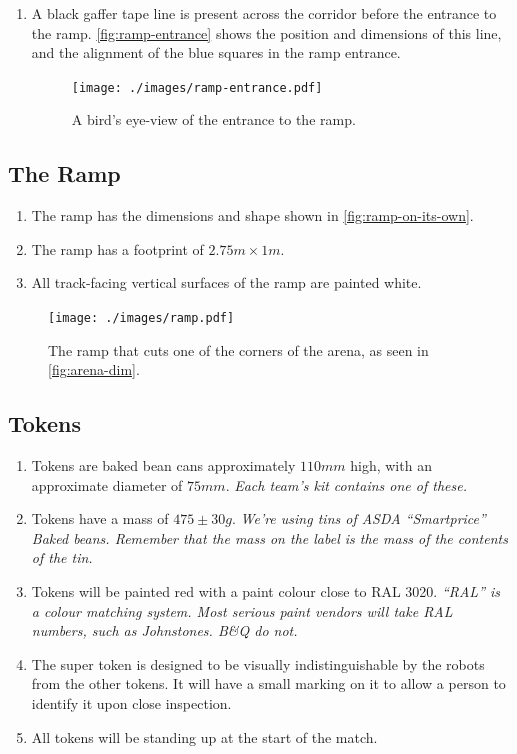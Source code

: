 \begin{enumerate}
\item A black gaffer tape line is present across the corridor before the entrance to the ramp.  \autoref{fig:ramp-entrance} shows the position and dimensions of this line, and the alignment of the blue squares in the ramp entrance.

  \begin{figure}
    \begin{center}
    \texttt{[image: ./images/ramp-entrance.pdf]}
    \end{center}
    \caption{\label{fig:ramp-entrance}A bird's eye-view of the entrance to the ramp.}
  \end{figure}


\end{enumerate}

\subsection{The Ramp}
\label{sub:Ramp}
\begin {enumerate}
\item The ramp has the dimensions and shape shown in \autoref{fig:ramp-on-its-own}.
\item The ramp has a footprint of $2.75m \times 1m$.
\item All track-facing vertical surfaces of the ramp are painted white.
\end {enumerate}

\begin{figure}
  \begin{center}
    \texttt{[image: ./images/ramp.pdf]}
  \end{center}
  \caption{\label{fig:ramp-on-its-own}The ramp that cuts one of the corners of the arena, as seen in \autoref{fig:arena-dim}.}
\end{figure}

\subsection{Tokens}
\label{sub:Tokens}
\begin {enumerate}
\item Tokens are baked bean cans approximately $110mm$ high, with an approximate diameter of $75mm$.
\emph{Each team's kit contains one of these.}
\item Tokens have a mass of $475\pm30g$.  \emph{We're using tins of ASDA ``Smartprice'' Baked beans.  Remember that the mass on the label is the mass of the contents of the tin.}
\item Tokens will be painted red with a paint colour close to RAL 3020.  \emph{``RAL'' is  a colour matching system.  Most serious paint vendors will take RAL numbers, such as Johnstones.  B\&Q do not.}

\item The super token is designed to be visually indistinguishable by the robots from the other tokens.  It will have a small marking on it to allow a person to identify it upon close inspection.
\item All tokens will be standing up at the start of the match.
\end {enumerate}

\clearpage
